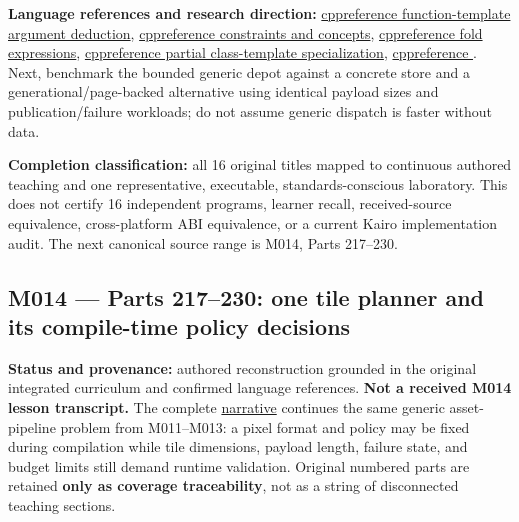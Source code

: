 \textbf{Language references and research direction:} \href{https://en.cppreference.com/w/cpp/language/template_argument_deduction}{cppreference function-template argument deduction}, \href{https://en.cppreference.com/w/cpp/language/constraints}{cppreference constraints and concepts}, \href{https://en.cppreference.com/w/cpp/language/fold}{cppreference fold expressions}, \href{https://en.cppreference.com/w/cpp/language/partial_specialization}{cppreference partial class-template specialization}, \href{https://en.cppreference.com/w/cpp/utility/forward}{cppreference }. Next, benchmark the bounded generic depot against a concrete store and a generational/page-backed alternative using identical payload sizes and publication/failure workloads; do not assume generic dispatch is faster without data.

\textbf{Completion classification:} all 16 original titles mapped to continuous authored teaching and one representative, executable, standards-conscious laboratory. This does not certify 16 independent programs, learner recall, received-source equivalence, cross-platform ABI equivalence, or a current Kairo implementation audit. The next canonical source range is M014, Parts 217--230.

\subsection{M014 --- Parts 217--230: one tile planner and its compile-time policy decisions}\label{appendix-fd090d982a15-m014-parts-217230-one-tile-planner-and-its-compile-time-policy-decisions}

\hypertarget{appendix-fd090d982a15-m014-parts-217230-one-tile-planner-and-its-compile-time-policy-decisions}{}

\textbf{Status and provenance:} authored reconstruction grounded in the original integrated curriculum and confirmed language references. \textbf{Not a received M014 lesson transcript.} The complete \hyperref[01-foundations-i-ch005-a-texture-tile-that-chooses-its-work-before-the-frame-begins]{narrative} continues the same generic asset-pipeline problem from M011--M013: a pixel format and policy may be fixed during compilation while tile dimensions, payload length, failure state, and budget limits still demand runtime validation. Original numbered parts are retained \textbf{only as coverage traceability}, not as a string of disconnected teaching sections.


